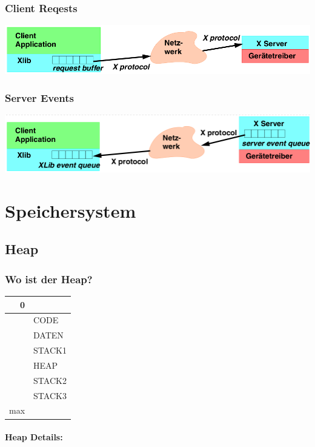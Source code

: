 \subsubsection{Client Reqests}
\includegraphics[width=\linewidth]{img/x_client_request.png}

\subsubsection{Server Events}
\includegraphics[width=\linewidth]{img/x_server_event.png}

\section{Speichersystem}

\subsection{Heap}

\subsubsection{Wo ist der Heap?}

\begin{tabular}{| r | l |}
\hline
0 & \\
\hline
& CODE\\
\hline
& DATEN\\
\hline
& STACK1\\
\hline
& HEAP\\
\hline
& STACK2\\
\hline
& STACK3\\
\hline
max & \\
\hline
\end{tabular}

\paragraph{Heap Details:}

